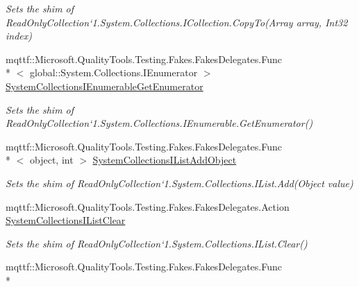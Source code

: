 \begin{DoxyCompactItemize}
\begin{DoxyCompactList}\small\item\em Sets the shim of Read\-Only\-Collection`1.System.\-Collections.\-I\-Collection.\-Copy\-To(\-Array array, Int32 index)\end{DoxyCompactList}\item 
mqttf\-::\-Microsoft.\-Quality\-Tools.\-Testing.\-Fakes.\-Fakes\-Delegates.\-Func\\*
$<$ global\-::\-System.\-Collections.\-I\-Enumerator $>$ \hyperlink{class_system_1_1_collections_1_1_object_model_1_1_fakes_1_1_shim_read_only_collection_3_01_t_01_4_a33e424e8115245e583a60b0d6cdade46}{System\-Collections\-I\-Enumerable\-Get\-Enumerator}
\begin{DoxyCompactList}\small\item\em Sets the shim of Read\-Only\-Collection`1.System.\-Collections.\-I\-Enumerable.\-Get\-Enumerator()\end{DoxyCompactList}\item 
mqttf\-::\-Microsoft.\-Quality\-Tools.\-Testing.\-Fakes.\-Fakes\-Delegates.\-Func\\*
$<$ object, int $>$ \hyperlink{class_system_1_1_collections_1_1_object_model_1_1_fakes_1_1_shim_read_only_collection_3_01_t_01_4_aceac64b62b1d242755cfc5d406931a1f}{System\-Collections\-I\-List\-Add\-Object}
\begin{DoxyCompactList}\small\item\em Sets the shim of Read\-Only\-Collection`1.System.\-Collections.\-I\-List.\-Add(\-Object value)\end{DoxyCompactList}\item 
mqttf\-::\-Microsoft.\-Quality\-Tools.\-Testing.\-Fakes.\-Fakes\-Delegates.\-Action \hyperlink{class_system_1_1_collections_1_1_object_model_1_1_fakes_1_1_shim_read_only_collection_3_01_t_01_4_afb3d8ac61057d43805674e5fb8a62250}{System\-Collections\-I\-List\-Clear}
\begin{DoxyCompactList}\small\item\em Sets the shim of Read\-Only\-Collection`1.System.\-Collections.\-I\-List.\-Clear()\end{DoxyCompactList}\item 
mqttf\-::\-Microsoft.\-Quality\-Tools.\-Testing.\-Fakes.\-Fakes\-Delegates.\-Func\\*

\end{DoxyCompactItemize}
